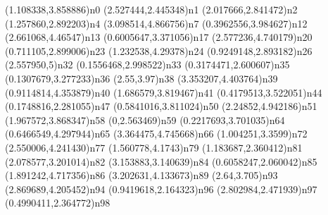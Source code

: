 \dotnode[](1.108338,3.858886){n0}
\dotnode[](2.527444,2.445348){n1}
\dotnode[](2.017666,2.841472){n2}
\dotnode[](1.257860,2.892203){n4}
\dotnode[](3.098514,4.866756){n7}
\dotnode[](0.3962556,3.984627){n12}
\dotnode[](2.661068,4.46547){n13}
\dotnode[fillcolor=gray](0.6005647,3.371056){n17}
\dotnode[](2.577236,4.740179){n20}
\dotnode[](0.711105,2.899006){n23}
\dotnode[](1.232538,4.29378){n24}
\dotnode[](0.9249148,2.893182){n26}
\dotnode[](2.557950,5){n32}
\dotnode[](0.1556468,2.998522){n33}
\dotnode[](0.3174471,2.600607){n35}
\dotnode[](0.1307679,3.277233){n36}
\dotnode[](2.55,3.97){n38}
\dotnode[](3.353207,4.403764){n39}
\dotnode[](0.9114814,4.353879){n40}
\dotnode[](1.686579,3.819467){n41}
\dotnode[](0.4179513,3.522051){n44}
\dotnode[](0.1748816,2.281055){n47}
\dotnode[](0.5841016,3.811024){n50}
\dotnode[](2.24852,4.942186){n51}
\dotnode[](1.967572,3.868347){n58}
\dotnode[](0,2.563469){n59}
\dotnode[](0.2217693,3.701035){n64}
\dotnode[](0.6466549,4.297944){n65}
\dotnode[](3.364475,4.745668){n66}
\dotnode[](1.004251,3.3599){n72}
\dotnode[](2.550006,4.241430){n77}
\dotnode[](1.560778,4.1743){n79}
\dotnode[](1.183687,2.360412){n81}
\dotnode[](2.078577,3.201014){n82}
\dotnode[](3.153883,3.140639){n84}
\dotnode[](0.6058247,2.060042){n85}
\dotnode[](1.891242,4.717356){n86}
\dotnode[](3.202631,4.133673){n89}
\dotnode[](2.64,3.705){n93}
\dotnode[](2.869689,4.205452){n94}
\dotnode[](0.9419618,2.164323){n96}
\dotnode[](2.802984,2.471939){n97}
\dotnode[](0.4990411,2.364772){n98}
